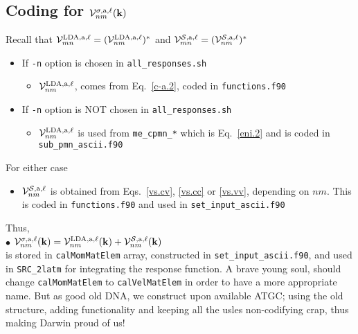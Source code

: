 \subsection{Coding for ${\mathbf{\cal V}}^{\sigma,\mathrm{a},\ell}_{nm}(\mathbf{k})$} 
Recall that 
${\mathbf{\cal V}}^{\mathrm{LDA},\mathrm{a},\ell}_{mn}=({\mathbf{\cal V}}^{\mathrm{LDA},\mathrm{a},\ell}_{nm})^*$
and 
${\mathbf{\cal V}}^{{\cal S},\mathrm{a},\ell}_{mn}=({\mathbf{\cal V}}^{{\cal S},\mathrm{a},\ell}_{nm})^*$ 
\begin{itemize}
\item If \verb=-n= option is chosen in \verb=all_responses.sh=
\begin{itemize}
\item ${\mathbf{\cal V}}^{\mathrm{LDA},\mathrm{a},\ell}_{nm}$, comes from
  Eq.~\eqref{c-a.2}, coded in \verb=functions.f90=
\end{itemize}
\item If \verb=-n= option is NOT chosen in \verb=all_responses.sh=
\begin{itemize}
\item ${\mathbf{\cal V}}^{\mathrm{LDA},\mathrm{a},\ell}_{nm}$ 
is used from \verb=me_cpmn_*=
  which is Eq.~\eqref{eni.2} and is coded in \verb=sub_pmn_ascii.f90=
\end{itemize}
\end{itemize}
For either case
\begin{itemize}
\item ${\mathbf{\cal V}}^{{\cal S},\mathrm{a},\ell}_{nm}$ 
is obtained from
  Eqs.~\eqref{vs.cv}, \eqref{vs.cc} or \eqref{vs.vv}, depending on
  $nm$. This is coded in \verb=functions.f90= and used in 
\verb=set_input_ascii.f90=  
\end{itemize}
Thus,\\
$\bullet$ 
${\mathbf{\cal V}}^{\sigma,\mathrm{a},\ell}_{nm}(\mathbf{k})={\mathbf{\cal V}}^{\mathrm{LDA},\mathrm{a},\ell}_{nm}(\mathbf{k})+{\mathbf{\cal V}}^{{\cal S},\mathrm{a},\ell}_{nm}(\mathbf{k})$\\
is stored in \verb=calMomMatElem= 
array, constructed in 
\verb=set_input_ascii.f90=, and used in \verb=SRC_2latm= for
integrating the response function. A brave young soul, should change   
\verb=calMomMatElem= to \verb=calVelMatElem= in order to have a more
appropriate name. But as good old DNA, we construct upon available
ATGC; using the old structure, adding functionality and  keeping all
the usles non-codifying crap, thus making Darwin
 proud of us! 

